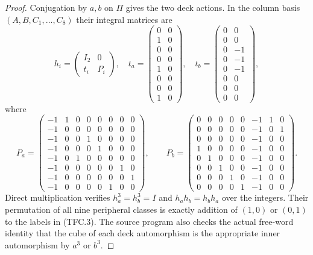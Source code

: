 \begin{proof}
Conjugation by $a,b$ on $\Pi$ gives the two deck actions.  In the
column basis $(A,B,C_1,\ldots,C_8)$ their integral matrices are
\[
 h_i=\begin{pmatrix}I_2&0\\t_i&P_i\end{pmatrix},
\quad
 t_a=\begin{pmatrix}0&0\\1&0\\0&0\\0&0\\1&0\\0&0\\0&0\\1&0\end{pmatrix},
\quad
 t_b=\begin{pmatrix}0&0\\0&0\\0&-1\\0&-1\\0&-1\\0&0\\0&0\\0&0\end{pmatrix},
                                                               \tag{TFC.4}
\]
where
\[
 P_a=\begin{pmatrix}
-1&1&0&0&0&0&0&0\\
-1&0&0&0&0&0&0&0\\
-1&0&0&1&0&0&0&0\\
-1&0&0&0&1&0&0&0\\
-1&0&1&0&0&0&0&0\\
-1&0&0&0&0&0&1&0\\
-1&0&0&0&0&0&0&1\\
-1&0&0&0&0&1&0&0
\end{pmatrix},\qquad
 P_b=\begin{pmatrix}
0&0&0&0&0&-1&1&0\\
0&0&0&0&0&-1&0&1\\
0&0&0&0&0&-1&0&0\\
1&0&0&0&0&-1&0&0\\
0&1&0&0&0&-1&0&0\\
0&0&1&0&0&-1&0&0\\
0&0&0&1&0&-1&0&0\\
0&0&0&0&1&-1&0&0
\end{pmatrix}.
\]
Direct multiplication verifies $h_a^3=h_b^3=I$ and $h_ah_b=h_bh_a$
over the integers.  Their permutation of all nine peripheral
classes is exactly addition of $(1,0)$ or $(0,1)$ to the labels in
(TFC.3).  The source program also checks the actual free-word
identity that the cube of each deck automorphism is the appropriate
inner automorphism by $a^3$ or $b^3$.


\end{proof}
